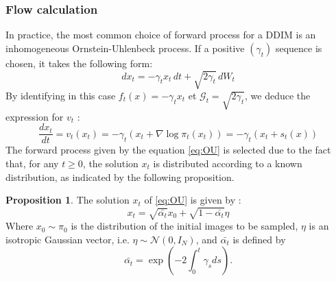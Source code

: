 \documentclass[a4paper,10pt]{article}
\theoremstyle{definition} %
\theoremstyle{definition} %
\newtheorem{proposition}[definition]{Proposition}
\theoremstyle{definition} %
\theoremstyle{definition} %
\newcommand{\0}{\boldsymbol{0}}
\begin{document}
\subsubsection{Flow calculation}\label{sec:calcul_numerique}
In practice, the most common choice of forward process for a DDIM is an inhomogeneous Ornstein-Uhlenbeck process. If a positive $(\gamma_t)$ sequence is chosen, it takes the following form:
\begin{equation}\label{eq:OU}
    dx_t = -\gamma_tx_t \,dt + \sqrt{2\gamma_t}\,dW_t
\end{equation}
By identifying in this case $f_t(x) = -\gamma_tx_t$ et $ \mathcal{G}_t = \sqrt{2\gamma_t}$, we deduce the expression for $v_t$ :
\begin{equation}\label{eq:backward}
    \frac{dx_t}{dt} = v_t(x_t) = -\gamma_t(x_t+\nabla \log \pi_t(x_t)) = -\gamma_t(x_t+s_t(x))
\end{equation}
The forward process given by the equation \cref{eq:OU} is selected due to the fact that, for any $t \geq 0$, the solution $x_t$ is distributed according to a known distribution, as indicated by the following proposition.
\begin{proposition}\label{prop:solution_processus_direct}
    The solution $x_t$ of \cref{eq:OU} is given by :
    \begin{equation}\label{eq:solforphi}
        x_t = \sqrt{\bar{\alpha_t}}x_0 + \sqrt{1-\bar{\alpha_t}}\eta
    \end{equation}
    Where $x_0 \sim \pi_0$ is the distribution of the initial images to be sampled, $\eta$ is an isotropic Gaussian vector, i.e. $\eta \sim \mathcal{N}(0, I_N)$, and $\bar{\alpha_t}$ is defined by 
    \[\bar{\alpha_t} = \exp{\left(-2\int_0^t \gamma_s ds\right)}.\]    
\end{proposition}
\end{document}
